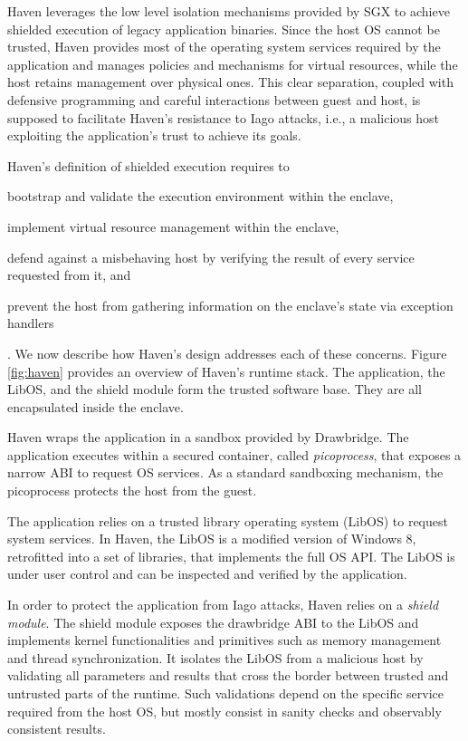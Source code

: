 Haven leverages the low level isolation mechanisms provided by SGX to achieve shielded execution of legacy application binaries.
Since the host OS cannot be trusted, Haven provides most of the operating system services required by the application and manages policies and mechanisms for virtual resources, while the host retains management over physical ones.
This clear separation, coupled with defensive programming and careful interactions between guest and host, is supposed to facilitate Haven's resistance to Iago attacks, i.e., a malicious host exploiting the application's trust to achieve its goals.

Haven's definition of shielded execution requires to
\begin{enumerate*}
	\item bootstrap and validate the execution environment within the enclave,
	\item implement virtual resource management within the enclave,
	\item defend against a misbehaving host by verifying the result of every service requested from it, and
	\item prevent the host from gathering information on the enclave's state via exception handlers
\end{enumerate*}.
We now describe how Haven's design addresses each of these concerns.
Figure \ref{fig:haven} provides an overview of Haven's runtime stack.
The application, the LibOS, and the shield module form the trusted software base.
They are all encapsulated inside the enclave.

Haven wraps the application in a sandbox provided by Drawbridge\cite{DBLP:conf/asplos/PorterBHOH11}.
The application executes within a secured container, called \emph{picoprocess}, that exposes a narrow ABI to request OS services.
As a standard sandboxing mechanism, the picoprocess protects the host from the guest.

The application relies on a trusted library operating system (LibOS) to request system services.
In Haven, the LibOS is a modified version of Windows 8, retrofitted into a set of libraries, that implements the full OS API.
The LibOS is under user control and can be inspected and verified by the application.

In order to protect the application from Iago attacks, Haven relies on a \emph{shield module}.
The shield module exposes the drawbridge ABI to the LibOS and implements kernel functionalities and primitives such as memory management and thread synchronization.
It isolates the LibOS from a malicious host by validating all parameters and results that cross the border between trusted and untrusted parts of the runtime.
Such validations depend on the specific service required from the host OS, but mostly consist in sanity checks and observably consistent results.


